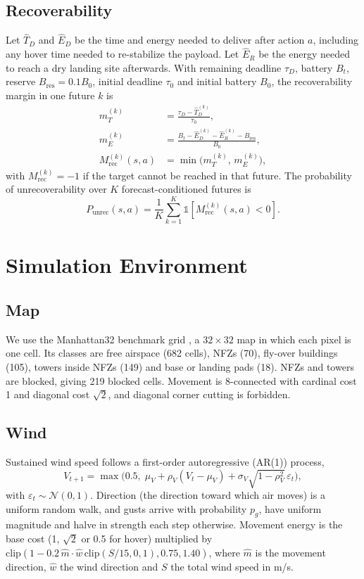 \documentclass{ieeeaccess}
\newcommand{\Punrec}{P_{\mathrm{unrec}}}
\newcommand{\Mrec}{M_{\mathrm{rec}}}
\begin{document}
\subsection{Recoverability}
Let $\hat T_D$ and $\hat E_D$ be the time and energy needed to deliver after action $a$, including any hover time needed to re-stabilize the payload. Let $\hat E_R$ be the energy needed to reach a dry landing site afterwards. With remaining deadline $\tau_D$, battery $B_t$, reserve $B_{\mathrm{res}}=0.1B_0$, initial deadline $\tau_0$ and initial battery $B_0$, the recoverability margin in one future $k$ is
\begin{align}
m_T^{(k)}&=\frac{\tau_D-\hat T_D^{(k)}}{\tau_0},\nonumber\\
m_E^{(k)}&=\frac{B_t-\hat E_D^{(k)}-\hat E_R^{(k)}-B_{\mathrm{res}}}{B_0},\nonumber\\
\Mrec^{(k)}(s,a)&=\min\big(m_T^{(k)},\,m_E^{(k)}\big),
\label{eq:margin}
\end{align}
with $\Mrec^{(k)}=-1$ if the target cannot be reached in that future. The probability of unrecoverability over $K$ forecast-conditioned futures is
\begin{equation}
\Punrec(s,a)=\frac{1}{K}\sum_{k=1}^{K}\mathbb{1}\!\left[\Mrec^{(k)}(s,a)<0\right].
\label{eq:punrec}
\end{equation}

\section{Simulation Environment}
\label{sec:sim}

\subsection{Map}
We use the Manhattan32 benchmark grid \cite{bayerlein2021}, a $32\times32$ map in which each pixel is one cell. Its classes are free airspace (682 cells), NFZs (70), fly-over buildings (105), towers inside NFZs (149) and base or landing pads (18). NFZs and towers are blocked, giving 219 blocked cells. Movement is 8-connected with cardinal cost 1 and diagonal cost $\sqrt{2}$, and diagonal corner cutting is forbidden.

\subsection{Wind}
Sustained wind speed follows a first-order autoregressive (AR(1)) process,
\begin{equation}
V_{t+1}=\max\!\big(0.5,\;\mu_V+\rho_V(V_t-\mu_V)+\sigma_V\sqrt{1-\rho_V^2}\,\varepsilon_t\big),
\label{eq:wind}
\end{equation}
with $\varepsilon_t\sim\mathcal{N}(0,1)$. Direction (the direction toward which air moves) is a uniform random walk, and gusts arrive with probability $p_g$, have uniform magnitude and halve in strength each step otherwise. Movement energy is the base cost (1, $\sqrt{2}$ or 0.5 for hover) multiplied by $\mathrm{clip}(1-0.2\,\hat m\cdot\hat w\,\mathrm{clip}(S/15,0,1),0.75,1.40)$, where $\hat m$ is the movement direction, $\hat w$ the wind direction and $S$ the total wind speed in m/s.
\end{document}
